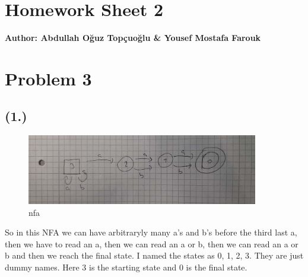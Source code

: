\documentclass{article}
\begin{document}
\section*{\huge Homework Sheet 2}
\begin{flushright}
   \textbf{Author: Abdullah Oğuz Topçuoğlu \& Yousef Mostafa Farouk}
\end{flushright}


\section*{Problem 3}

\subsection*{(1.)}
\begin{figure}[h!]
  \centering
  \includegraphics[width=0.9\textwidth]{3_nfa.jpeg}
  \caption{nfa}
\end{figure}

So in this NFA we can have arbitraryly many a's and b's before the third last a, then we have to read an a, then we can read an a or b, then we can read an a or b and then we reach the final state.
I named the states as 0, 1, 2, 3. They are just dummy names. Here 3 is the starting state and 0 is the final state.
\end{document}
